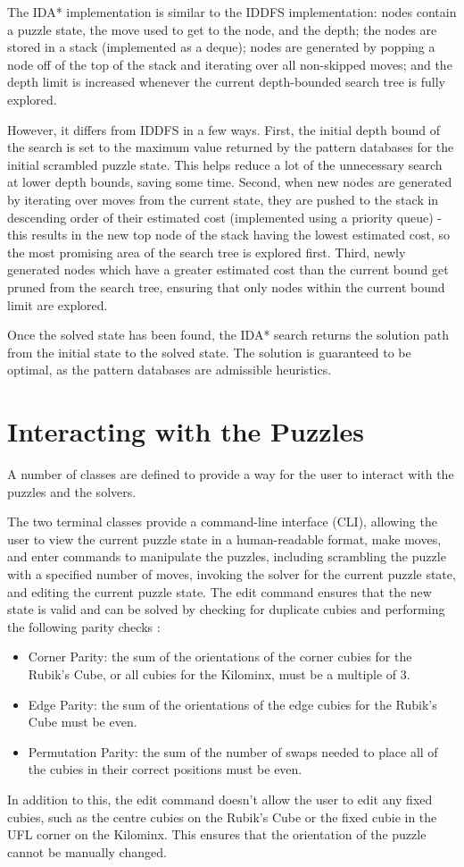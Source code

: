 The IDA* implementation is similar to the IDDFS implementation: nodes contain a puzzle state, the move used to get to the node, and the depth; the nodes are stored in a stack (implemented as a deque); nodes are generated by popping a node off of the top of the stack and iterating over all non-skipped moves; and the depth limit is increased whenever the current depth-bounded search tree is fully explored.

However, it differs from IDDFS in a few ways. First, the initial depth bound of the search is set to the maximum value returned by the pattern databases for the initial scrambled puzzle state. This helps reduce a lot of the unnecessary search at lower depth bounds, saving some time. Second, when new nodes are generated by iterating over moves from the current state, they are pushed to the stack in descending order of their estimated cost (implemented using a priority queue) - this results in the new top node of the stack having the lowest estimated cost, so the most promising area of the search tree is explored first. Third, newly generated nodes which have a greater estimated cost than the current bound get pruned from the search tree, ensuring that only nodes within the current bound limit are explored.

Once the solved state has been found, the IDA* search returns the solution path from the initial state to the solved state. The solution is guaranteed to be optimal, as the pattern databases are admissible heuristics.

\section{Interacting with the Puzzles}
A number of classes are defined to provide a way for the user to interact with the puzzles and the solvers.

The two terminal classes provide a command-line interface (CLI), allowing the user to view the current puzzle state in a human-readable format, make moves, and enter commands to manipulate the puzzles, including scrambling the puzzle with a specified number of moves, invoking the solver for the current puzzle state, and editing the current puzzle state. The edit command ensures that the new state is valid and can be solved by checking for duplicate cubies and performing the following parity checks \cite{parity}:
\begin{itemize}
    \item Corner Parity: the sum of the orientations of the corner cubies for the Rubik's Cube, or all cubies for the Kilominx, must be a multiple of 3.
    \item Edge Parity: the sum of the orientations of the edge cubies for the Rubik's Cube must be even.
    \item Permutation Parity: the sum of the number of swaps needed to place all of the cubies in their correct positions must be even.
\end{itemize}
In addition to this, the edit command doesn't allow the user to edit any fixed cubies, such as the centre cubies on the Rubik's Cube or the fixed cubie in the UFL corner on the Kilominx. This ensures that the orientation of the puzzle cannot be manually changed.

